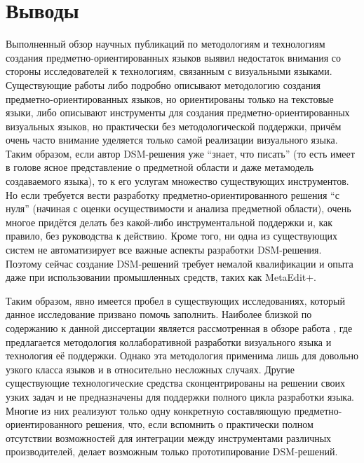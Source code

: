 \section{Выводы}
Выполненный обзор научных публикаций по методологиям и технологиям создания предметно-ориентированных 
языков выявил недостаток внимания со стороны исследователей к технологиям, связанным 
с визуальными языками. Существующие работы либо подробно описывают методологию создания 
предметно-ориентированных языков, но ориентированы только на текстовые языки, либо 
описывают инструменты для создания предметно-ориентированных визуальных языков, но 
практически без методологической поддержки, причём очень часто внимание уделяется 
только самой реализации визуального языка. Таким образом, если автор DSM-решения уже 
"`знает, что писать"' (то есть имеет в голове ясное представление о предметной области 
и даже метамодель создаваемого языка), то к его услугам множество существующих инструментов. 
Но если требуется вести разработку предметно-ориентированного решения "`с нуля"' (начиная 
с оценки осуществимости и анализа предметной области), очень многое придётся делать 
без какой-либо инструментальной поддержки и, как правило, без руководства к действию.
Кроме того, ни одна из существующих систем не автоматизирует все важные аспекты разработки DSM-решения.
Поэтому сейчас создание DSM-решений требует немалой квалификации и опыта даже при 
использовании промышленных средств, таких как MetaEdit+.

Таким образом, явно имеется пробел в существующих исследованиях, который данное исследование
призвано помочь заполнить. Наиболее близкой по содержанию к данной диссертации является
рассмотренная в обзоре работа \cite{repenning1995agentsheets}, где предлагается методология
коллаборативной разработки визуального языка и технология её поддержки. Однако эта
методология применима лишь для довольно узкого класса языков и в относительно несложных
случаях. Другие существующие технологические средства сконцентрированы на решении
своих узких задач и не предназначены для поддержки полного цикла разработки языка.
Многие из них реализуют только одну конкретную составляющую предметно-ориентированного
решения, что, если вспомнить о практически полном отсутствии возможностей для интеграции
между инструментами различных производителей, делает возможным только прототипирование
DSM-решений.
